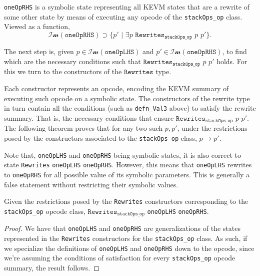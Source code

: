 \begin{definition}[oneOpRHS]\label{def:oneOpRHS}
\leanok{}

\texttt{oneOpRHS} is a symbolic state representing all KEVM states that are a
rewrite of some other state by means of executing any opcode of the
\texttt{stackOps_op} class. Viewed as a
function, $$\mathcal{Im}(\texttt{oneOpRHS}) \supset \{p'\,\, |\,\, \exists
p\,\,\texttt{Rewrites}_{\texttt{stackOps_op}}\,\, p \,\, p'\}.$$

\end{definition}

The next step is, given $p\in\mathcal{Im}(\texttt{oneOpLHS})$ and
$p'\in\mathcal{Im}(\texttt{oneOpRHS})$, to find which are the necessary
conditions such that $\texttt{Rewrites}_{\texttt{stackOps_op}}\,\, p \,\, p'$
holds. For this we turn to the constructors of the $\texttt{Rewrites}$ type.

Each constructor represents an opcode, encoding the KEVM summary of executing such
opcode on a symbolic state. The constructors of the rewrite type in turn contain
all the conditions (such as \texttt{defn_Val3} above) to satisfy the rewrite
summary. That is, the necessary conditions that ensure
$\texttt{Rewrites}_{\texttt{stackOps_op}}\,\, p \,\, p'$. The following theorem
proves that for any two such $p, p'$, under the restrictions posed by the
constructors associated to the \texttt{stackOps_op} class, $p\rightarrow p'$.

Note that, \texttt{oneOpLHS} and \texttt{oneOpRHS} being symbolic states, it is
also correct to state \texttt{Rewrites} \texttt{oneOpLHS} \texttt{oneOpRHS}.
However, this means that \texttt{oneOpLHS} rewrites to \texttt{oneOpRHS} for all
possible value of its symbolic parameters. This is generally a false statement
without restricting their symbolic values.

\begin{theorem}\label{thm:oneOpRw}
\leanok
{}

Given the restrictions posed by the \texttt{Rewrites} constructors corresponding
to the \texttt{stackOps_op} opcode class,
$\texttt{Rewrites}_{\texttt{stackOps_op}}$ \texttt{oneOpLHS} \texttt{oneOpRHS}.

\end{theorem}

\begin{proof}
\leanok

We have that \texttt{oneOpLHS} and \texttt{oneOpRHS} are generalizations of the
states represented in the \texttt{Rewrites} constructors for the
\texttt{stackOps_op} class. As such, if we specialize the definitions of
\texttt{oneOpLHS} and \texttt{oneOpRHS} down to the opcode, since we're assuming
the conditions of satisfaction for every \texttt{stackOps_op} opcode summary,
the result follows.

\end{proof}

